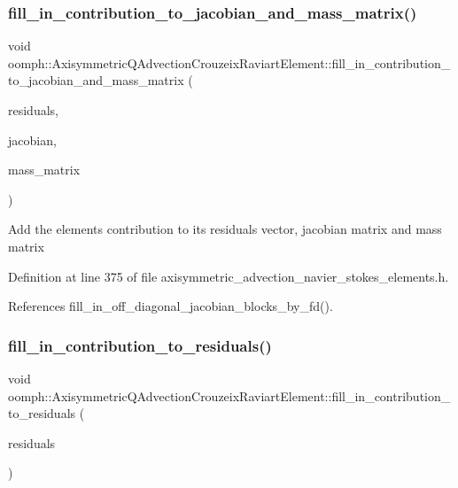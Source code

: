 \subsubsection{\texorpdfstring{fill\+\_\+in\+\_\+contribution\+\_\+to\+\_\+jacobian\+\_\+and\+\_\+mass\+\_\+matrix()}{fill\_in\_contribution\_to\_jacobian\_and\_mass\_matrix()}}
{\footnotesize\ttfamily void oomph\+::\+Axisymmetric\+Q\+Advection\+Crouzeix\+Raviart\+Element\+::fill\+\_\+in\+\_\+contribution\+\_\+to\+\_\+jacobian\+\_\+and\+\_\+mass\+\_\+matrix (\begin{DoxyParamCaption}\item[{Vector$<$ double $>$ \&}]{residuals,  }\item[{Dense\+Matrix$<$ double $>$ \&}]{jacobian,  }\item[{Dense\+Matrix$<$ double $>$ \&}]{mass\+\_\+matrix }\end{DoxyParamCaption})\hspace{0.3cm}{\ttfamily [inline]}}

Add the element\textquotesingle{}s contribution to its residuals vector, jacobian matrix and mass matrix 

Definition at line 375 of file axisymmetric\+\_\+advection\+\_\+navier\+\_\+stokes\+\_\+elements.\+h.



References fill\+\_\+in\+\_\+off\+\_\+diagonal\+\_\+jacobian\+\_\+blocks\+\_\+by\+\_\+fd().

\mbox{\label{classoomph_1_1AxisymmetricQAdvectionCrouzeixRaviartElement_a74e05eb28d4674c636827d450c7e03f9}} 
\subsubsection{\texorpdfstring{fill\+\_\+in\+\_\+contribution\+\_\+to\+\_\+residuals()}{fill\_in\_contribution\_to\_residuals()}}
{\footnotesize\ttfamily void oomph\+::\+Axisymmetric\+Q\+Advection\+Crouzeix\+Raviart\+Element\+::fill\+\_\+in\+\_\+contribution\+\_\+to\+\_\+residuals (\begin{DoxyParamCaption}\item[{Vector$<$ double $>$ \&}]{residuals }\end{DoxyParamCaption})\hspace{0.3cm}{\ttfamily [inline]}}



